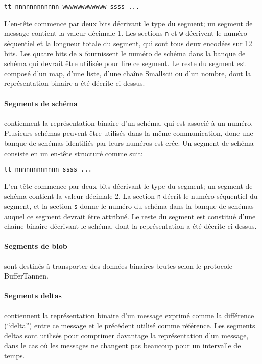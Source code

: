 \begin{verbatim}
tt nnnnnnnnnnnn wwwwwwwwwwww ssss ...
\end{verbatim}

L'en-tête commence par deux bits décrivant le type du segment; un segment de message contient la valeur décimale 1. Les sections \verb+n+ et \verb+w+ décrivent le numéro séquentiel et la longueur totale du segment, qui sont tous deux encodées sur 12 bits. Les quatre bits de \verb+s+ fournissent le numéro de schéma dans la banque de schéma qui devrait être utilisée pour lire ce segment. Le reste du segment est composé d'un map, d'une liste, d'une chaîne Smallscii ou d'un nombre, dont la représentation binaire a été décrite ci-dessus.

\paragraph{Segments de schéma} contiennent la représentation binaire d'un schéma, qui est associé à un numéro. Plusieurs schémas peuvent être utilisés dans la même communication, donc une banque de schémas identifiés par leurs numéros est crée. Un segment de schéma consiste en un en-tête structuré comme suit:

\begin{verbatim}
tt nnnnnnnnnnnn ssss ...
\end{verbatim}

L'en-tête commence par deux bits décrivant le type du segment; un segment de schéma contient la valeur décimale 2. La section \verb+n+ décrit le numéro séquentiel du segment, et la section \verb+s+ donne le numéro du schéma dans la banque de schémas auquel ce segment devrait être attribué. Le reste du segment est constitué d'une chaîne binaire décrivant le schéma, dont la représentation a été décrite ci-dessus.

\paragraph{Segments de blob} sont destinés à transporter des données binaires brutes selon le protocole BufferTannen.

\paragraph{Segments deltas} contiennent la représentation binaire d'un message exprimé comme la différence (``delta'') entre ce message et le précédent utilisé comme référence. Les segments deltas sont utilisés pour comprimer davantage la représentation d'un message, dans le cas où les messages ne changent pas beaucoup pour un intervalle de temps.

